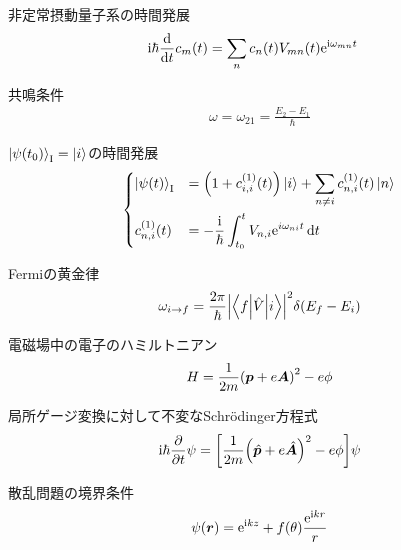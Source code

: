 \documentclass{report}
\begin{document}
  \begin{itembox}[l]{非定常摂動量子系の時間発展}
    \begin{align*}
      \mathrm{i}\hbar\dv{t}c_m(t) &= \sum_{n}c_n(t)V_{mn}(t)\mathrm{e}^{\mathrm{i}\omega_{mn}t}
    \end{align*}
  \end{itembox}
  \begin{itembox}[l]{共鳴条件}
    \begin{align*}
      \omega = \omega_{21} = \frac{E_2 - E_1}{\hbar}
    \end{align*}
  \end{itembox}
  \begin{itembox}[l]{$\ket{\psi(t_0)}_{\mathrm{I}} = \ket{i}$の時間発展}
    \begin{align*}
      \begin{dcases}
        \ket{\psi(t)}_{\mathrm{I}}& = \qty(1 + c_{i, i}^{(1)}(t))\ket{i} + \sum_{n\neq i}c_{n, i}^{(1)}(t)\ket{n} \\
        c_{n, i}^{(1)}(t) &= -\frac{\mathrm{i}}{\hbar}\int_{t_0}^{t}V_{n, i}\mathrm{e}^{i\omega_{ni}t}\dd{t}
      \end{dcases}
    \end{align*}
  \end{itembox}
  \begin{itembox}[l]{Fermiの黄金律}
    \begin{align*}
      \omega_{i\to f} = \frac{2\pi}{\hbar}\abs{\mel**{f}{\hat{V}}{i}}^2\delta(E_f - E_i)
    \end{align*}
  \end{itembox}
  \begin{itembox}[l]{電磁場中の電子のハミルトニアン}
    \begin{align*}
      H = \frac{1}{2m}\qty(\bm{p} + e\bm{A})^2 - e\phi
    \end{align*}
  \end{itembox}
  \begin{itembox}[l]{局所ゲージ変換に対して不変なSchrödinger方程式}
    \begin{align*}
      \mathrm{i}\hbar\pdv{t}\psi = \qty[\frac{1}{2m}\qty(\hat{\bm{p}} + e\hat{\bm{A}})^2 - e\phi]\psi
    \end{align*}
  \end{itembox}
  \begin{itembox}[l]{散乱問題の境界条件}
    \begin{align*}
      \psi(\bm{r}) = \mathrm{e}^{\mathrm{i} kz} + f(\theta) \frac{\mathrm{e}^{\mathrm{i} kr}}{r}
    \end{align*}
  \end{itembox}
\end{document}
